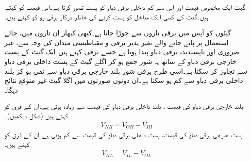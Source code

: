 گیٹ ایک مخصوص قیمت اور اس سے کم داخلی برقی دباو کو پست تصور کرتا ہے۔اس قیمت کو کہتے ہیں۔گیٹ کے کسی ایک مداخل کو پست کرنے کی خاطر درکار برقی رو کو   کہتے ہیں۔
	
 گیٹوں کو آپس میں برقی تاروں سے جوڑا جاتا ہے۔کبھی کبھار ان تاروں میں، جائے استعمال پر پائے جانے والے تغیر پذیر برقی و مقناطیسی میدان کی وجہ سے، غیر ضروری اور ناپسندیدہ برقی دباو پیدا ہوتا ہے جسے برقی   کہتے ہیں۔ایک گیٹ کے پست خارجی برقی دباو کے ساتھ یہ شور جمع ہو کر اگلے گیٹ کے پست داخلی برقی دباو سے تجاوز کر سکتا ہے۔اسی طرح برقی شور بلند خارجی برقی دباو سے نفی ہو کر بلند داخلی برقی دباو سے کم ہو سکتا ہے۔ان دونوں صورتوں میں اگلا گیٹ غیر متوقع نتائج دیگا۔

 بلند خارجی برقی دباو کی قیمت ، بلند داخلی برقی دباو کی قیمت سے زیادہ ہوتی ہے۔ان کے فرق کو  کہتے ہیں (شکل  دیکھیں)۔
\begin{align}
V_{NH}=V_{OH}-V_{IH}
\end{align}
 پست خارجی برقی دباو کی قیمت، پست داخلی برقی دباو کی قیمت سے کم ہوتی ہے۔ان کے فرق کو   کہتے ہیں۔
\begin{align}
V_{NL}=V_{IL}-V_{OL}
\end{align}


